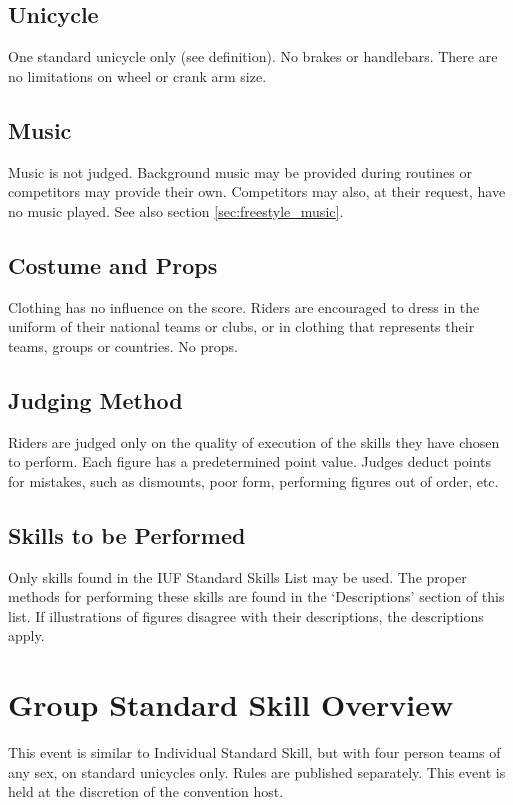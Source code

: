 \subsection{Unicycle}
One standard unicycle only (see definition).
No brakes or handlebars.
There are no limitations on wheel or crank arm size.

\subsection{Music}
Music is not judged.
Background music may be provided during routines or competitors may provide their own.
Competitors may also, at their request, have no music played.
See also section \ref{sec:freestyle_music}.

\subsection{Costume and Props}
Clothing has no influence on the score.
Riders are encouraged to dress in the uniform of their national teams or clubs, or in clothing that represents their teams, groups or countries.
No props.

\subsection{Judging Method}
Riders are judged only on the quality of execution of the skills they have chosen to perform.
Each figure has a predetermined point value.
Judges deduct points for mistakes, such as dismounts, poor form, performing figures out of order, etc.

\subsection{Skills to be Performed}
Only skills found in the IUF Standard Skills List may be used.
The proper methods for performing these skills are found in the ‘Descriptions' section of this list.
If illustrations of figures disagree with their descriptions, the descriptions apply.

\section{Group Standard Skill Overview}
This event is similar to Individual Standard Skill, but with four person teams of any sex, on standard unicycles only.
Rules are published separately.
This event is held at the discretion of the convention host.

